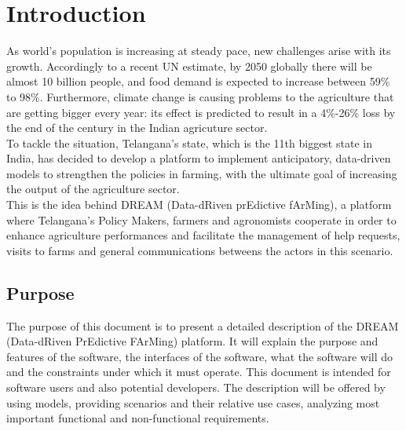 \documentclass[10pt]{article}
\begin{document}
\section{Introduction}
As world's population is increasing at steady pace, new challenges arise with its growth.
Accordingly to a recent UN estimate, by 2050 globally there will be almost 10 billion people, 
and food demand is expected to increase between 59\% to 98\%. Furthermore, climate change is causing 
problems to the agriculture that are getting bigger every year: its effect is predicted to result in a 
4\%-26\% loss by the end of the century in the Indian agricuture sector.\\
To tackle the situation, Telangana's state, which is the 11th biggest state in India, has decided to develop a 
platform to implement anticipatory, data-driven models to strengthen the policies in farming, with the ultimate
goal of increasing the output of the agriculture sector.\\
This is the idea behind DREAM (Data-dRiven prEdictive fArMing), a platform where Telangana's
Policy Makers, farmers and agronomists cooperate in order to enhance agriculture performances and facilitate the 
management of help requests, visits to farms and general communications betweens the actors in this scenario.
\subsection{Purpose}
The purpose of this document is to present a detailed description of the DREAM
 (Data-dRiven PrEdictive FArMing) platform. It will explain the purpose and features of 
 the software, the interfaces of the software, what the software will do and the constraints
  under which it must operate. This document is intended for software users and also 
  potential developers. The description will be offered by using models, providing scenarios and 
  their relative use cases, analyzing most important functional and non-functional requirements.
\end{document}
